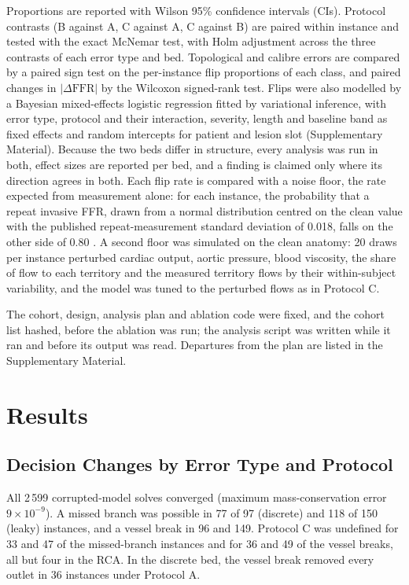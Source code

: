 \documentclass[journal]{IEEEtran}
\begin{document}
Proportions are reported with Wilson 95\% confidence intervals (CIs). Protocol contrasts (B against A, C against A,
C against B) are paired within instance and tested with the exact McNemar test, with Holm adjustment across the
three contrasts of each error type and bed. Topological and calibre errors are compared by a paired sign test on
the per-instance flip proportions of each class, and paired changes in $|\Delta\mathrm{FFR}|$ by the Wilcoxon
signed-rank test. Flips were also modelled by a Bayesian mixed-effects logistic regression fitted by variational
inference, with error type, protocol and their interaction, severity, length and baseline band as fixed effects and
random intercepts for patient and lesion slot (Supplementary Material). Because the two beds differ in structure,
every analysis was run in both, effect sizes are reported per bed, and a finding is claimed only where its direction
agrees in both. Each flip rate is compared with a noise floor, the rate expected from measurement alone: for each instance, the
probability that a repeat invasive FFR, drawn from a normal distribution centred on the clean value with the
published repeat-measurement standard deviation of 0.018, falls on the other side of 0.80
\cite{johnson2015,petraco2013}. A second floor was simulated on the clean anatomy: 20 draws per instance perturbed cardiac
output, aortic pressure, blood viscosity, the share of flow to each territory and the measured territory flows by their
within-subject variability, and
the model was tuned to the perturbed flows as in Protocol C.

The cohort, design, analysis plan and ablation code were fixed, and the cohort list hashed, before the ablation was
run; the analysis script was written while it ran and before its output was read.
Departures from the plan are listed in the Supplementary Material.

\section{Results}
\subsection{Decision Changes by Error Type and Protocol}
All 2\,599 corrupted-model solves converged (maximum mass-conservation error $9\times10^{-9}$). A missed branch was possible in 77 of 97 (discrete) and 118 of 150 (leaky)
instances, and a vessel break in 96 and 149. Protocol C was undefined for 33 and 47 of the missed-branch instances and for 36 and 49 of the
vessel breaks, all but four in the RCA. In the discrete bed, the vessel break removed every outlet in 36 instances
under Protocol A.
\end{document}
